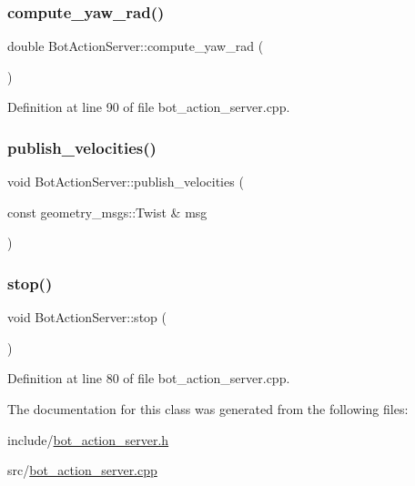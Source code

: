 \subsubsection{\texorpdfstring{compute\+\_\+yaw\+\_\+rad()}{compute\_yaw\_rad()}}
{\footnotesize\ttfamily double Bot\+Action\+Server\+::compute\+\_\+yaw\+\_\+rad (\begin{DoxyParamCaption}{ }\end{DoxyParamCaption})}



Definition at line 90 of file bot\+\_\+action\+\_\+server.\+cpp.

\mbox{\label{class_bot_action_server_a821f9e38243f2b5ffadfbe62aa3ec1b2}} 
\subsubsection{\texorpdfstring{publish\+\_\+velocities()}{publish\_velocities()}}
{\footnotesize\ttfamily void Bot\+Action\+Server\+::publish\+\_\+velocities (\begin{DoxyParamCaption}\item[{const geometry\+\_\+msgs\+::\+Twist \&}]{msg }\end{DoxyParamCaption})}

\mbox{\label{class_bot_action_server_a3e91308d1567b72b949cd19c63a808b1}} 
\subsubsection{\texorpdfstring{stop()}{stop()}}
{\footnotesize\ttfamily void Bot\+Action\+Server\+::stop (\begin{DoxyParamCaption}{ }\end{DoxyParamCaption})}



Definition at line 80 of file bot\+\_\+action\+\_\+server.\+cpp.



The documentation for this class was generated from the following files\+:\begin{DoxyCompactItemize}
\item 
include/\hyperlink{bot__action__server_8h}{bot\+\_\+action\+\_\+server.\+h}\item 
src/\hyperlink{bot__action__server_8cpp}{bot\+\_\+action\+\_\+server.\+cpp}\end{DoxyCompactItemize}
